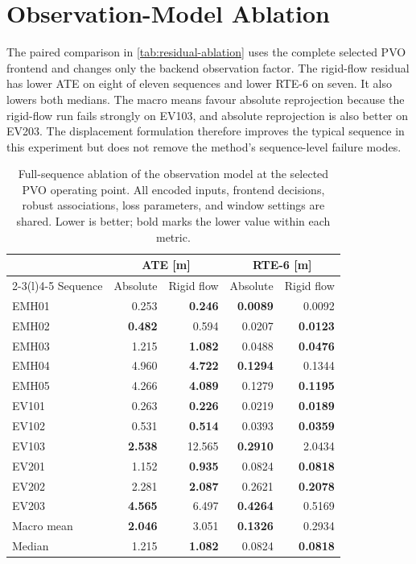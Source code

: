 \section{Observation-Model Ablation}

The paired comparison in \autoref{tab:residual-ablation} uses the complete
selected PVO frontend and changes only the backend observation factor. The
rigid-flow residual has lower ATE on eight of eleven sequences and lower RTE-6
on seven. It also lowers both medians. The macro means favour absolute
reprojection because the rigid-flow run fails strongly on EV103, and absolute
reprojection is also better on EV203. The displacement formulation therefore
improves the typical sequence in this experiment but does not remove the
method's sequence-level failure modes.

\begin{table}[p]
  \centering
  \caption[Ablation of the observation model]{Full-sequence ablation of the observation model at the selected PVO
  operating point. All encoded inputs, frontend decisions, robust associations,
  loss parameters, and window settings are shared. Lower is better; bold marks
  the lower value within each metric.}
  \label{tab:residual-ablation}
  \begin{tabular}{@{}lrrrr@{}}
    \toprule
    & \multicolumn{2}{c}{ATE [m]} & \multicolumn{2}{c}{RTE-6 [m]} \\
    \cmidrule(lr){2-3}\cmidrule(l){4-5}
    Sequence & Absolute & Rigid flow & Absolute & Rigid flow \\
    \midrule
    EMH01 & 0.253 & \textbf{0.246} & \textbf{0.0089} & 0.0092 \\
    EMH02 & \textbf{0.482} & 0.594 & 0.0207 & \textbf{0.0123} \\
    EMH03 & 1.215 & \textbf{1.082} & 0.0488 & \textbf{0.0476} \\
    EMH04 & 4.960 & \textbf{4.722} & \textbf{0.1294} & 0.1344 \\
    EMH05 & 4.266 & \textbf{4.089} & 0.1279 & \textbf{0.1195} \\
    EV101 & 0.263 & \textbf{0.226} & 0.0219 & \textbf{0.0189} \\
    EV102 & 0.531 & \textbf{0.514} & 0.0393 & \textbf{0.0359} \\
    EV103 & \textbf{2.538} & 12.565 & \textbf{0.2910} & 2.0434 \\
    EV201 & 1.152 & \textbf{0.935} & 0.0824 & \textbf{0.0818} \\
    EV202 & 2.281 & \textbf{2.087} & 0.2621 & \textbf{0.2078} \\
    EV203 & \textbf{4.565} & 6.497 & \textbf{0.4264} & 0.5169 \\
    \midrule
    Macro mean & \textbf{2.046} & 3.051 & \textbf{0.1326} & 0.2934 \\
    Median & 1.215 & \textbf{1.082} & 0.0824 & \textbf{0.0818} \\
    \bottomrule
  \end{tabular}
\end{table}

